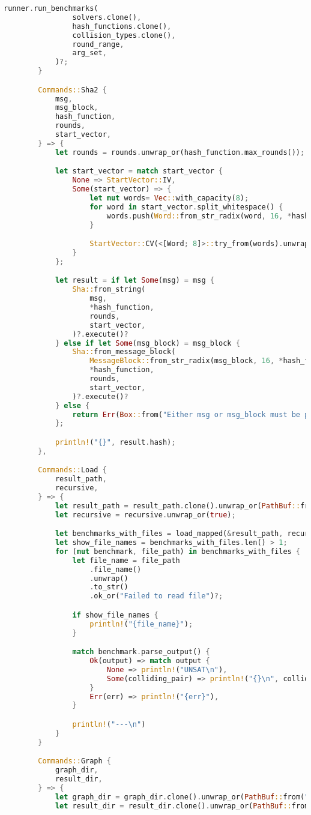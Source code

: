 \begin{lstlisting}[language=rust, caption={main.rs}]
			runner.run_benchmarks(
				solvers.clone(),
				hash_functions.clone(),
				collision_types.clone(),
				round_range,
				arg_set,
			)?;
		}

		Commands::Sha2 {
			msg,
			msg_block,
			hash_function,
			rounds,
			start_vector,
		} => {
			let rounds = rounds.unwrap_or(hash_function.max_rounds());

			let start_vector = match start_vector {
				None => StartVector::IV,
				Some(start_vector) => {
					let mut words= Vec::with_capacity(8);
					for word in start_vector.split_whitespace() {
						words.push(Word::from_str_radix(word, 16, *hash_function)?);
					}

					StartVector::CV(<[Word; 8]>::try_from(words).unwrap())
				}
			};

			let result = if let Some(msg) = msg {
				Sha::from_string(
					msg,
					*hash_function,
					rounds,
					start_vector,
				)?.execute()?
			} else if let Some(msg_block) = msg_block {
				Sha::from_message_block(
					MessageBlock::from_str_radix(msg_block, 16, *hash_function)?,
					*hash_function,
					rounds,
					start_vector,
				)?.execute()?
			} else {
				return Err(Box::from("Either msg or msg_block must be provided"));
			};

			println!("{}", result.hash);
		},

		Commands::Load {
			result_path,
			recursive,
		} => {
			let result_path = result_path.clone().unwrap_or(PathBuf::from("results/"));
			let recursive = recursive.unwrap_or(true);

			let benchmarks_with_files = load_mapped(&result_path, recursive)?;
			let show_file_names = benchmarks_with_files.len() > 1;
			for (mut benchmark, file_path) in benchmarks_with_files {
				let file_name = file_path
					.file_name()
					.unwrap()
					.to_str()
					.ok_or("Failed to read file")?;

				if show_file_names {
					println!("{file_name}");
				}

				match benchmark.parse_output() {
					Ok(output) => match output {
						None => println!("UNSAT\n"),
						Some(colliding_pair) => println!("{}\n", colliding_pair),
					}
					Err(err) => println!("{err}"),
				}

				println!("---\n")
			}
		}

		Commands::Graph {
			graph_dir,
			result_dir,
		} => {
			let graph_dir = graph_dir.clone().unwrap_or(PathBuf::from("graphs/"));
			let result_dir = result_dir.clone().unwrap_or(PathBuf::from("results/"));


\end{lstlisting}
